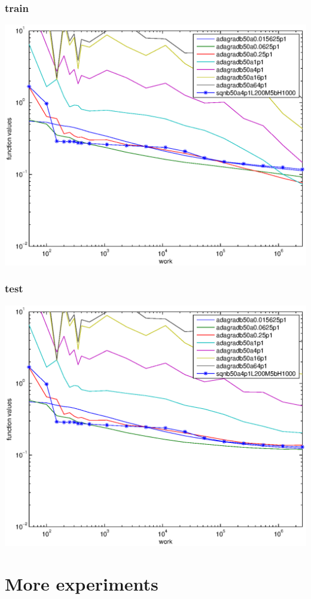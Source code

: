 \documentclass[12pt]{article}
\begin{document}
\subsubsection{train}
\includegraphics[scale=1]{paperOnImpFigures/rcv1-adagrad-l-train.eps}
\subsubsection{test}
\includegraphics[scale=1]{paperOnImpFigures/rcv1-adagrad-l-test.eps}

\section{More experiments}
\end{document}
